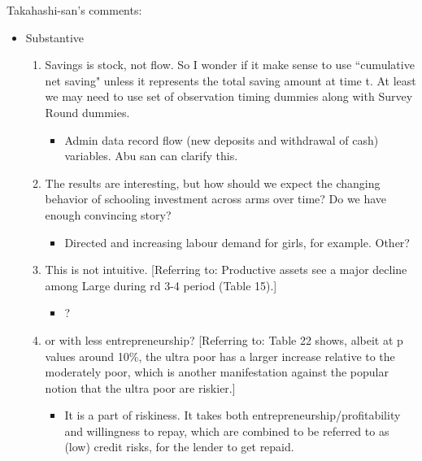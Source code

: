 Takahashi-san's comments:
\begin{itemize}
\vspace{1.0ex}\setlength{\itemsep}{1.0ex}\setlength{\baselineskip}{12pt}
\item	Substantive
\begin{enumerate}
\vspace{1.0ex}\setlength{\itemsep}{1.0ex}\setlength{\baselineskip}{12pt}
\item	Savings is stock, not flow. So I wonder if it make sense to use ``cumulative net saving" unless it represents the total saving amount at time t.  At least we may need to use set of observation timing dummies along with Survey Round dummies. 
	\begin{itemize}
	\vspace{1.0ex}\setlength{\itemsep}{1.0ex}\setlength{\baselineskip}{12pt}
	\item	Admin data record flow (new deposits and withdrawal of cash) variables. Abu san can clarify this.
	\end{itemize}
\item	The results are interesting, but how should we expect the changing behavior of schooling investment across arms over time? Do we have enough convincing story? 
	\begin{itemize}
	\vspace{1.0ex}\setlength{\itemsep}{1.0ex}\setlength{\baselineskip}{12pt}
	\item	Directed and increasing labour demand for girls, for example. Other?
	\end{itemize}
\item	This is not intuitive. [Referring to: Productive assets see a major decline among Large during rd 3-4 period (Table 15).]
	\begin{itemize}
	\vspace{1.0ex}\setlength{\itemsep}{1.0ex}\setlength{\baselineskip}{12pt}
	\item	?
	\end{itemize}
\item	or with less entrepreneurship? [Referring to: Table 22 shows, albeit at p
values around 10\%, the ultra poor has a larger increase relative to the moderately poor, which is another manifestation against the popular notion that the ultra poor are riskier.]
	\begin{itemize}
	\vspace{1.0ex}\setlength{\itemsep}{1.0ex}\setlength{\baselineskip}{12pt}
	\item	It is a part of riskiness. It takes both entrepreneurship/profitability and willingness to repay, which are combined to be referred to as (low) credit risks, for the lender to get repaid. 
	\end{itemize}
\end{enumerate}


\end{itemize}

